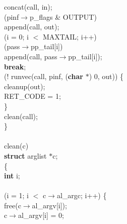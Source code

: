 \begin{flushleft}
\hspace*{6\indentation}concat(call, in);\mbox{}\\
\hspace*{3\indentation}{\bf if} (pinf$\rightarrow$p\_flags \& OUTPUT)\mbox{}\\
\hspace*{6\indentation}append(call, out);\mbox{}\\
\hspace*{3\indentation}{\bf for} (i = 0; i $<$ MAXTAIL; i++)\mbox{}\\
\hspace*{6\indentation}{\bf if} (pass$\rightarrow$pp\_tail[i])\mbox{}\\
\hspace*{9\indentation}append(call, pass$\rightarrow$pp\_tail[i]);\mbox{}\\
\hspace*{6\indentation}{\bf else}  {\bf break};\mbox{}\\
\hspace*{3\indentation}{\bf if} (! runvec(call, pinf, ({\bf char} $\ast$) 0, out)) \{\mbox{}\\
\hspace*{6\indentation}cleanup(out);\mbox{}\\
\hspace*{6\indentation}RET\_CODE = 1;\mbox{}\\
\hspace*{3\indentation}\}\mbox{}\\
\hspace*{3\indentation}clean(call);\mbox{}\\
\}\mbox{}\\
\mbox{}\\
clean(c)\mbox{}\\
\hspace*{3\indentation}{\bf register} {\bf struct} arglist $\ast$c;\mbox{}\\
\{\mbox{}\\
\hspace*{3\indentation}{\bf register} {\bf int} i;\mbox{}\\
\mbox{}\\
\hspace*{3\indentation}{\bf for} (i = 1; i $<$ c$\rightarrow$al\_argc; i++) \{\mbox{}\\
\hspace*{6\indentation}free(c$\rightarrow$al\_argv[i]);\mbox{}\\
\hspace*{6\indentation}c$\rightarrow$al\_argv[i] = 0;\mbox{}\\

\end{flushleft}
